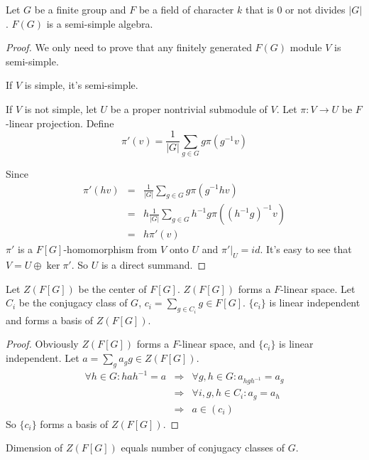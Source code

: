 \documentclass[12pt]{book}
\begin{document}
	
	\begin{theorem}[Maschke]
		Let $G$ be a finite group and $F$ be a field of character $k$ that is $0$ or not divides $|G|$. $F(G)$ is a semi-simple algebra.
	\end{theorem}
	\begin{proof}
		We only need to prove that any finitely generated $F(G)$ module $V$ is semi-simple.
		
		If $V$ is simple, it's semi-simple.
		
		If $V$ is not simple, let $U$ be a proper nontrivial submodule of $V$. Let $\pi:V\rightarrow U$ be $F$-linear projection. Define
		\begin{equation}
			\pi'(v)=\frac 1 {|G|}\sum_{g\in G}g\pi(g^{-1}v)
		\end{equation}
		
		Since
		\begin{eqnarray}
			\pi'(hv)&=&\frac 1 {|G|}\sum_{g\in G}g\pi(g^{-1}hv)\\
			&=&h\frac 1 {|G|}\sum_{g\in G}h^{-1}g\pi((h^{-1}g)^{-1}v)\\
			&=&h\pi'(v)
		\end{eqnarray}
		$\pi'$ is a $F[G]$-homomorphism from $V$ onto $U$ and $\pi'|_U=id$. It's easy to see that $V=U\oplus \ker \pi'$. So $U$ is a direct summand.
	\end{proof}

	\begin{theorem}
		Let $Z(F[G])$ be the center of $F[G]$. $Z(F[G])$ forms a $F$-linear space. Let $C_i$ be the conjugacy class of $G$, $c_i=\sum_{g\in C_i}g\in F[G]$. $\{c_i\}$ is linear independent and forms a basis of $Z(F[G])$.
	\end{theorem}
	\begin{proof}
		Obviously $Z(F[G])$ forms a $F$-linear space, and $\{c_i\}$ is linear independent. Let $a=\sum_g a_g g\in Z(F[G])$. 
		\begin{eqnarray}
			\forall h\in G:hah^{-1}=a&\Rightarrow& \forall g,h\in G: a_{hgh^{-1}}=a_g\\
			&\Rightarrow& \forall i,g,h\in C_i: a_g=a_h\\
			&\Rightarrow & a\in (c_i)
		\end{eqnarray}
		So $\{c_i\}$ forms a basis of $Z(F[G])$.
	\end{proof}
	
	\begin{corollary}
		Dimension of $Z(F[G])$ equals number of conjugacy classes of $G$.
	\end{corollary}
	
\end{document}
